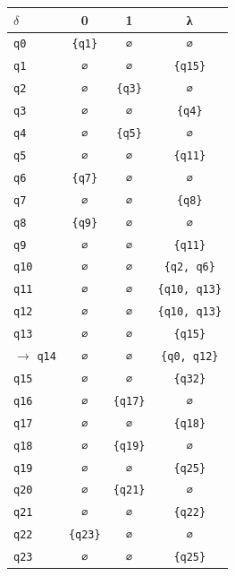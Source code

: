 \documentclass[11pt]{article}
\begin{document}
\begin{center}\small\begin{tabular}{lccc}\toprule
$\delta$ & 0 & 1 & λ \\\midrule
 \texttt{q0} & \texttt{\{q1\}} & \texttt{∅} & \texttt{∅} \\
 \texttt{q1} & \texttt{∅} & \texttt{∅} & \texttt{\{q15\}} \\
 \texttt{q2} & \texttt{∅} & \texttt{\{q3\}} & \texttt{∅} \\
 \texttt{q3} & \texttt{∅} & \texttt{∅} & \texttt{\{q4\}} \\
 \texttt{q4} & \texttt{∅} & \texttt{\{q5\}} & \texttt{∅} \\
 \texttt{q5} & \texttt{∅} & \texttt{∅} & \texttt{\{q11\}} \\
 \texttt{q6} & \texttt{\{q7\}} & \texttt{∅} & \texttt{∅} \\
 \texttt{q7} & \texttt{∅} & \texttt{∅} & \texttt{\{q8\}} \\
 \texttt{q8} & \texttt{\{q9\}} & \texttt{∅} & \texttt{∅} \\
 \texttt{q9} & \texttt{∅} & \texttt{∅} & \texttt{\{q11\}} \\
 \texttt{q10} & \texttt{∅} & \texttt{∅} & \texttt{\{q2, q6\}} \\
 \texttt{q11} & \texttt{∅} & \texttt{∅} & \texttt{\{q10, q13\}} \\
 \texttt{q12} & \texttt{∅} & \texttt{∅} & \texttt{\{q10, q13\}} \\
 \texttt{q13} & \texttt{∅} & \texttt{∅} & \texttt{\{q15\}} \\
$\to$ \texttt{q14} & \texttt{∅} & \texttt{∅} & \texttt{\{q0, q12\}} \\
 \texttt{q15} & \texttt{∅} & \texttt{∅} & \texttt{\{q32\}} \\
 \texttt{q16} & \texttt{∅} & \texttt{\{q17\}} & \texttt{∅} \\
 \texttt{q17} & \texttt{∅} & \texttt{∅} & \texttt{\{q18\}} \\
 \texttt{q18} & \texttt{∅} & \texttt{\{q19\}} & \texttt{∅} \\
 \texttt{q19} & \texttt{∅} & \texttt{∅} & \texttt{\{q25\}} \\
 \texttt{q20} & \texttt{∅} & \texttt{\{q21\}} & \texttt{∅} \\
 \texttt{q21} & \texttt{∅} & \texttt{∅} & \texttt{\{q22\}} \\
 \texttt{q22} & \texttt{\{q23\}} & \texttt{∅} & \texttt{∅} \\
 \texttt{q23} & \texttt{∅} & \texttt{∅} & \texttt{\{q25\}} \\

\end{tabular}
\end{center}
\end{document}

